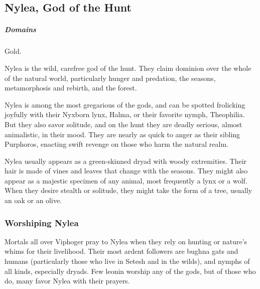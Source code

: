 
\subsection*{Nylea, God of the Hunt} \label{ssec::nylea}
    \subparagraph{Domains} Gold.

    Nylea is the wild, carefree god of the hunt.
    They claim dominion over the whole of the natural world, particularly hunger and predation, the seasons, metamorphosis and rebirth, and the forest.

    Nylea is among the most gregarious of the gods, and can be spotted frolicking joyfully with their Nyxborn lynx, Halma, or their favorite nymph, Theophilia.
    But they also savor solitude, and on the hunt they are deadly serious, almost animalistic, in their mood.
    They are nearly as quick to anger as their sibling Purphoros, enacting swift revenge on those who harm the natural realm.

    Nylea usually appears as a green-skinned dryad with woody extremities.
    Their hair is made of vines and leaves that change with the seasons.
    They might also appear as a majestic specimen of any animal, most frequently a lynx or a wolf.
    When they desire stealth or solitude, they might take the form of a tree, usually an oak or an olive.


    \subsubsection{Worshiping Nylea}
        Mortals all over Viphoger pray to Nylea when they rely on hunting or nature's whims for their livelihood.
        Their most ardent followers are bughna gats and humans (particularly those who live in Setesh and in the wilds), and nymphs of all kinds, especially dryads.
        Few leonin worship any of the gods, but of those who do, many favor Nylea with their prayers.

